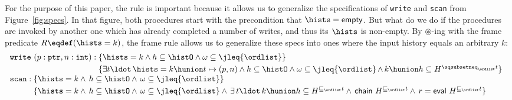 For the purpose of this paper, the rule is important because it allows
us to generalize the specifications of {\tt write} and {\tt scan} from
Figure~\ref{fig:specs}. In that figure, both procedures start with the
precondition that $\hists = \mathsf{empty}$. But what do we do if the
procedures are invoked by another one which has already completed a
number of writes, and thus its $\hists$ is non-empty. By
$\circledast$-ing with the frame predicate $R \eqdef (\hists = k)$,
the frame rule allows us to generalize these specs into ones where the
input history equals an arbitrary $k$:
\[
\begin{array}{l}
\mathtt{write}\ (p : \mathtt{ptr}, n : \mathtt{int}) : 
\!\!\!\begin{array}[t]{l}
\{\hists = k \wedge h \subseteq \histO
           \wedge \omega \subseteq \jleq{\ordlist}\}\\[3pt]
\{\exists t\ldot\, \hists = k \hunion t \mapsto (p, n) \wedge h \subseteq \histO \wedge
  \omega \subseteq \jleq{\ordlist}\,{\wedge}\, k \hunion h \subseteq H^{\hbox{}\sqsubsetneq_\ordlist t}\}
\end{array}\\
%
\mathtt{scan} : 
\!\!\!\begin{array}[t]{l}
\{\hists = k \wedge\, h \subseteq \histO \wedge\,
          \omega \subseteq \jleq{\ordlist}\}\\[3pt]
          \{\hists = k \wedge\, h \subseteq \histO \wedge\,
            \omega \subseteq \jleq{\ordlist} \wedge\, \exists\, t\ldot\, %
             k \hunion h \subseteq H^{\hbox{}\sqsubseteq_\ordlist t} \wedge\,
             \mathsf{chain}\ H^{\hbox{}\sqsubseteq_\ordlist t} \wedge\,
             r = \mathsf{eval}\ {H^{\hbox{}\sqsubseteq_\ordlist t}}\}
       \end{array}
\end{array}
\]


